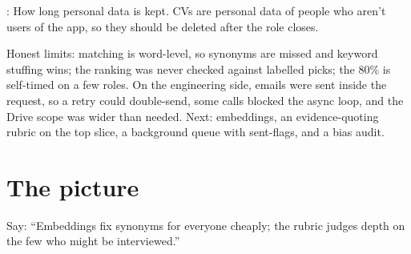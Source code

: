 \begin{definition}
: How long personal data is kept. CVs are personal data of people who aren't users of the app, so they should be deleted after the role closes.
\end{definition}

\begin{sayit}
Honest limits: matching is word-level, so synonyms are missed and keyword stuffing wins; the ranking was never checked against labelled picks; the 80\% is self-timed on a few roles. On the engineering side, emails were sent inside the request, so a retry could double-send, some calls blocked the async loop, and the Drive scope was wider than needed. Next: embeddings, an evidence-quoting rubric on the top slice, a background queue with sent-flags, and a bias audit.
\end{sayit}

\section{The picture}

\begin{sayit}
\begin{pic}
\end{pic}
Say: ``Embeddings fix synonyms for everyone cheaply; the rubric judges depth on the few who might be interviewed.''
\end{sayit}

